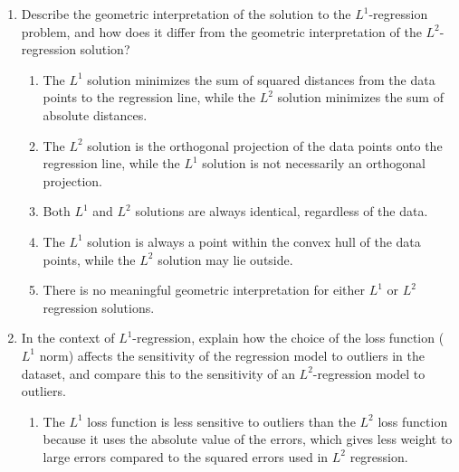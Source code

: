 \documentclass{article}%
\begin{document}
\begin{enumerate}
\begin{enumerate}%
\item $L^1$-regression is computationally faster than $L^2$-regression due to its simpler loss function.%
\item $L^1$-regression involves a non-differentiable loss function, making it more challenging to solve using gradient-based methods.%
\item $L^1$-regression requires significantly more memory than $L^2$-regression.%
\item $L^1$-regression is inherently unstable and prone to numerical errors.%
\item There is no significant computational difference between $L^1$ and $L^2$ regression.%
\end{enumerate}%
\vspace{1em}%
\item Describe the geometric interpretation of the solution to the $L^1$-regression problem, and how does it differ from the geometric interpretation of the $L^2$-regression solution?%
\begin{enumerate}%
\item The $L^1$ solution minimizes the sum of squared distances from the data points to the regression line, while the $L^2$ solution minimizes the sum of absolute distances.%
\item The $L^2$ solution is the orthogonal projection of the data points onto the regression line, while the $L^1$ solution is not necessarily an orthogonal projection.%
\item Both $L^1$ and $L^2$ solutions are always identical, regardless of the data.%
\item The $L^1$ solution is always a point within the convex hull of the data points, while the $L^2$ solution may lie outside.%
\item There is no meaningful geometric interpretation for either $L^1$ or $L^2$ regression solutions.%
\end{enumerate}%
\vspace{1em}%
\item In the context of $L^1$-regression, explain how the choice of the loss function ($L^1$ norm) affects the sensitivity of the regression model to outliers in the dataset, and compare this to the sensitivity of an $L^2$-regression model to outliers.%
\begin{enumerate}%
\item The $L^1$ loss function is less sensitive to outliers than the $L^2$ loss function because it uses the absolute value of the errors, which gives less weight to large errors compared to the squared errors used in $L^2$ regression.%

\end{enumerate}
\end{enumerate}
\end{document}
